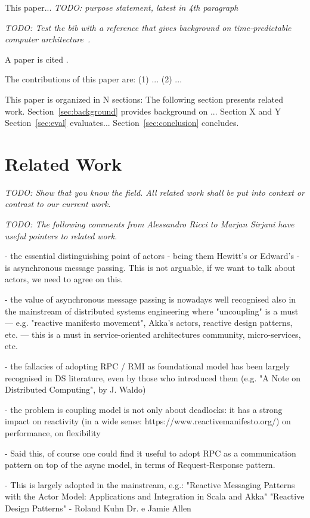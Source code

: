 \documentclass[a4paper, conference]{IEEEtran}
\newcommand{\todo}[1]{{\emph{TODO: #1}}}
\begin{document}
This paper... \todo{purpose statement, latest in 4th paragraph}

\todo{Test the bib with a reference that gives background on time-predictable
computer architecture~\cite{tpca:jes}.}

A paper is cited \cite{paper:example}.

The contributions of this paper are: (1) ... (2) ...

This paper is organized in N sections: The following section presents related work.
Section~\ref{sec:background} provides background on ...
Section X and Y 
Section~\ref{sec:eval} evaluates...
Section~\ref{sec:conclusion} concludes.

\section{Related Work}
\label{sec:related}

\todo{Show that you know the field. All related work shall be put
into context or contrast to our current work.}

\todo{The following comments from Alessandro Ricci  to Marjan Sirjani have useful pointers to related work.}

- the essential distinguishing point of actors - being them Hewitt's or Edward's -
  is asynchronous message passing. This is not arguable, if we want to talk
  about actors, we need to agree on this.

- the value of asynchronous message passing is nowadays well recognised
   also in the mainstream of distributed systems engineering
   where "uncoupling" is a must
   --- e.g. "reactive manifesto movement", Akka's actors, reactive design patterns, etc.
   --- this is a must in service-oriented architectures community, micro-services, etc.

- the fallacies of adopting RPC / RMI as foundational model has been largely
   recognised in DS literature, even by those who introduced them
   (e.g. "A Note on Distributed Computing", by J. Waldo)

- the problem is coupling model is not only about deadlocks: it has a
   strong impact on reactivity (in a wide sense: https://www.reactivemanifesto.org/)
   on performance, on flexibility

- Said this, of course one could find it useful to adopt RPC as a communication pattern
  on top of the async model, in terms of Request-Response pattern.

- This is largely adopted in the mainstream, e.g.:
    "Reactive Messaging Patterns with the Actor Model: Applications and Integration in Scala and Akka"
    "Reactive Design Patterns" - Roland Kuhn Dr. e Jamie Allen
\end{document}
